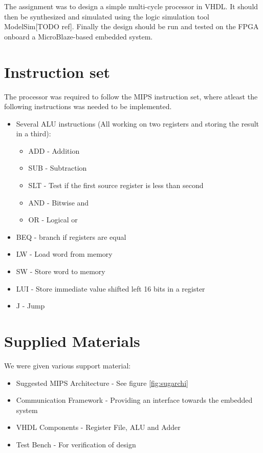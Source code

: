The assignment was to design a simple multi-cycle processor in VHDL.
It should then be synthesized and simulated using the logic simulation tool ModelSim[TODO ref].
Finally the design should be run and tested on the FPGA onboard a MicroBlaze-based embedded system.

\section{Instruction set}
The processor was required to follow the MIPS instruction set,
where atleast the following instructions was needed to be implemented.
\begin{itemize}
    \item Several ALU instructions (All working on two registers and storing the result in a third):
        \begin{itemize}
            \item ADD - Addition
            \item SUB - Subtraction
            \item SLT - Test if the first source register is less than second
            \item AND - Bitwise and
            \item OR  - Logical or
        \end{itemize}
    \item BEQ - branch if registers are equal
    \item LW - Load word from memory
    \item SW - Store word to memory
    \item LUI - Store immediate value shifted left 16 bits in a register
    \item J - Jump
\end{itemize}

\section{Supplied Materials}
We were given various support material:
\begin{itemize}
    \item Suggested MIPS Architecture - See figure \ref{fig:sugarchi}
    \item Communication Framework - Providing an interface towards the embedded system
    \item VHDL Components - Register File, ALU and Adder
    \item Test Bench - For verification of design
\end{itemize}

